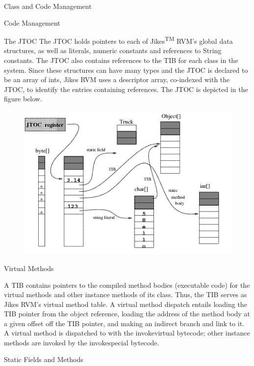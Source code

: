 \begin{section}{Class and Code Management}
\begin{subsection}{Code Management}
\begin{subsubsection}{The JTOC}
The JTOC holds pointers to each of Jikes\textsuperscript{TM} RVM's global data structures, as well as literals, numeric constants and references to String constants. The JTOC also contains references to the TIB for each class in the system. Since these structures can have many types and the JTOC is declared to be an array of ints, Jikes RVM uses a descriptor array, co-indexed with the JTOC, to identify the entries containing references. The JTOC is depicted in the figure below.

\begin{figure}[h]
  \centering
  \includegraphics[width=\linewidth]{images/ClassAndCodeManagement-JTOC}
\end{figure}

\end{subsubsection}

\begin{subsubsection}{Virtual Methods}

A TIB contains pointers to the compiled method bodies (executable code) for the virtual methods and other instance methods of its class. Thus, the TIB serves as Jikes RVM's virtual method table. A virtual method dispatch entails loading the TIB pointer from the object reference, loading the address of the method body at a given offset off the TIB pointer, and making an indirect branch and link to it. A virtual method is dispatched to with the invokevirtual bytecode; other instance methods are invoked by the invokespecial bytecode.

\end{subsubsection}

\begin{subsubsection}{Static Fields and Methods}


\end{subsubsection}
\end{subsection}
\end{section}
